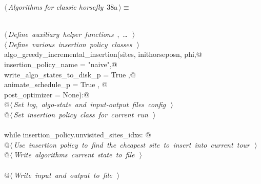 \documentclass[11.5pt]{report}
\begin{document}
\begin{flushleft} \small\label{scrap45}\raggedright\small
{} $\langle\,${\itshape Algorithms for classic horsefly}\nobreak\ {\footnotesize {38a}}$\,\rangle\equiv$
\vspace{-1ex}
\begin{list}{}{} \item
\mbox{}\verb@@\\
\mbox{}\verb@@\hbox{$\langle\,${\itshape Define auxiliary helper functions}\nobreak\ {\footnotesize {}, \ldots\ }$\,\rangle$}\verb@@\\
\mbox{}\verb@@\hbox{$\langle\,${\itshape Define various insertion policy classes}\nobreak\ {\footnotesize {}}$\,\rangle$}\verb@@\\
\mbox{}\verb@def algo_greedy_incremental_insertion(sites, inithorseposn, phi,@\\
\mbox{}\verb@                                      insertion_policy_name       = "naive",@\\
\mbox{}\verb@                                      write_algo_states_to_disk_p = True   ,@\\
\mbox{}\verb@                                      animate_schedule_p          = True   , @\\
\mbox{}\verb@                                      post_optimizer              = None):@\\
\mbox{}\verb@      @\hbox{$\langle\,${\itshape Set log, algo-state and input-output files config}\nobreak\ {\footnotesize {}}$\,\rangle$}\verb@@\\
\mbox{}\verb@      @\hbox{$\langle\,${\itshape Set insertion policy class for current run}\nobreak\ {\footnotesize {}}$\,\rangle$}\verb@@\\
\mbox{}\verb@@\\
\mbox{}\verb@      while insertion_policy.unvisited_sites_idxs: @\\
\mbox{}\verb@         @\hbox{$\langle\,${\itshape Use insertion policy to find the cheapest site to insert into current tour}\nobreak\ {\footnotesize {}}$\,\rangle$}\verb@@\\
\mbox{}\verb@         @\hbox{$\langle\,${\itshape Write algorithms current state to file}\nobreak\ {\footnotesize {}}$\,\rangle$}\verb@@\\
\mbox{}\verb@@\\
\mbox{}\verb@      @\hbox{$\langle\,${\itshape Write input and output to file}\nobreak\ {\footnotesize {}}$\,\rangle$}\verb@@\\

\end{list}
\end{flushleft}
\end{document}
